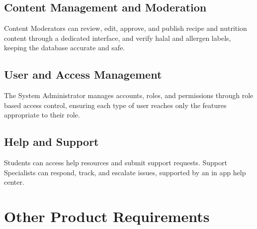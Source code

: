 \documentclass[11pt,a4paper]{article}
\begin{document}
\subsection{Content Management and Moderation}
Content Moderators can review, edit, approve, and publish recipe and nutrition content through a dedicated interface, and verify halal and allergen labels, keeping the database accurate and safe.

\subsection{User and Access Management}
The System Administrator manages accounts, roles, and permissions through role based access control, ensuring each type of user reaches only the features appropriate to their role.

\subsection{Help and Support}
Students can access help resources and submit support requests. Support Specialists can respond, track, and escalate issues, supported by an in app help center.

\section{Other Product Requirements}
\end{document}
